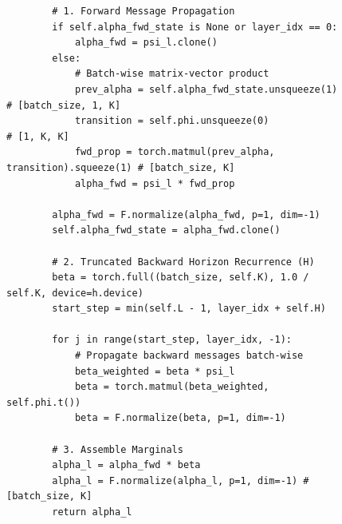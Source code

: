 \begin{figure}[h]
\begin{minipage}{0.95\textwidth}
\begin{verbatim}
        # 1. Forward Message Propagation
        if self.alpha_fwd_state is None or layer_idx == 0:
            alpha_fwd = psi_l.clone()
        else:
            # Batch-wise matrix-vector product
            prev_alpha = self.alpha_fwd_state.unsqueeze(1) # [batch_size, 1, K]
            transition = self.phi.unsqueeze(0)             # [1, K, K]
            fwd_prop = torch.matmul(prev_alpha, transition).squeeze(1) # [batch_size, K]
            alpha_fwd = psi_l * fwd_prop
            
        alpha_fwd = F.normalize(alpha_fwd, p=1, dim=-1)
        self.alpha_fwd_state = alpha_fwd.clone()
        
        # 2. Truncated Backward Horizon Recurrence (H)
        beta = torch.full((batch_size, self.K), 1.0 / self.K, device=h.device)
        start_step = min(self.L - 1, layer_idx + self.H)
        
        for j in range(start_step, layer_idx, -1):
            # Propagate backward messages batch-wise
            beta_weighted = beta * psi_l
            beta = torch.matmul(beta_weighted, self.phi.t())
            beta = F.normalize(beta, p=1, dim=-1)
            
        # 3. Assemble Marginals
        alpha_l = alpha_fwd * beta
        alpha_l = F.normalize(alpha_l, p=1, dim=-1) # [batch_size, K]
        return alpha_l
\end{verbatim}
\end{minipage}
\end{figure}

